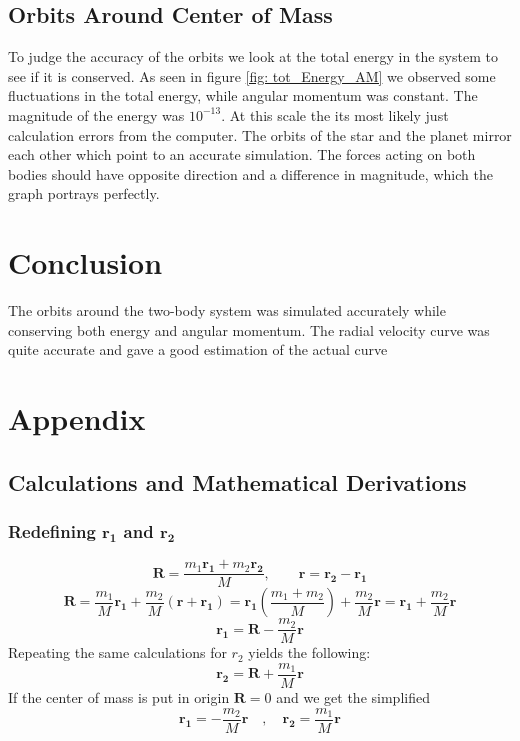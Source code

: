 \documentclass[reprint,english,notitlepage]{revtex4-2}
\begin{document}
	\subsection{Orbits Around Center of Mass}
	To judge the accuracy of the orbits we look at the total energy in the system to see if it is conserved. As seen in figure \ref{fig: tot_Energy_AM} we observed some fluctuations in the total energy, while angular momentum was constant. The magnitude of the energy was $ 10^{-13} $. At this scale the its most likely just calculation errors from the computer. The orbits of the star and the planet mirror each other which point to an accurate simulation. The forces acting on both bodies should have opposite direction and a difference in magnitude, which the graph portrays perfectly. 
	



\section{Conclusion}
The orbits around the two-body system was simulated accurately while conserving both energy and angular momentum. The radial velocity curve was quite accurate and gave a good estimation of the actual curve 
		

\section{Appendix}

	\subsection{Calculations and Mathematical Derivations}
		\subsubsection{Redefining $ \mathbf{r_1} $ and $ \mathbf{r_2} $}\label{r1r2 calc}
			\[
			\mathbf{R} = \frac{m_1 \mathbf{r_1} + m_2 \mathbf{r_2}}{M}, \qquad \mathbf{r} = \mathbf{r_2} - \mathbf{r_1}
			\]
			\[
			\mathbf{R} = \frac{m_1}{M}\mathbf{r_1} + \frac{m_2}{M} \left( \mathbf{r} + \mathbf{r_1} \right) = \mathbf{r_1} \left( \frac{m_1 + m_2}{M} \right) + \frac{m_2}{M} \mathbf{r} = \mathbf{r_1} + \frac{m_2}{M} \mathbf{r}
			\]
			\[
			\mathbf{r_1} = \mathbf{R} - \frac{m_2}{M}\mathbf{r}
			\]
			Repeating the same calculations for $ r_2 $ yields the following: 
			\[
			\mathbf{r_2} = \mathbf{R} + \frac{m_1}{M} \mathbf{r}
			\]
			If the center of mass is put in origin $ \mathbf{R} = 0 $ and we get the simplified
			\[
			\mathbf{r_1} = - \frac{m_2}{M}\mathbf{r} \quad , \quad \mathbf{r_2} = \frac{m_1}{M}\mathbf{r}
			\]
\end{document}
